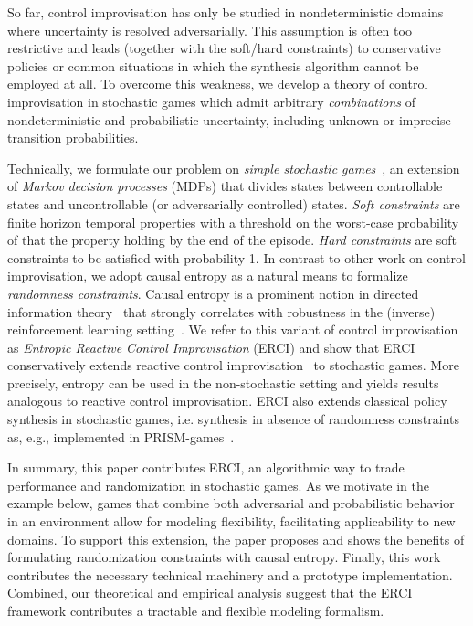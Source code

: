 So far, control improvisation has  only be studied in 
nondeterministic domains where uncertainty is resolved
adversarially. This assumption is often too restrictive and leads
(together with the soft/hard constraints) to conservative policies or
common situations in which the synthesis algorithm cannot be employed
at all. To overcome this weakness, we develop a theory of control
improvisation in stochastic games which admit
arbitrary \emph{combinations} of nondeterministic and probabilistic
uncertainty, including unknown or imprecise transition
probabilities. 

Technically, we formulate our problem on \emph{simple stochastic
games}~\cite{DBLP:conf/dimacs/Condon90}, an extension of \emph{Markov decision processes} (MDPs) that divides states
between controllable states and uncontrollable (or adversarially
controlled) states. \emph{Soft constraints} are finite horizon
temporal properties with a threshold on the worst-case probability of
that the property holding by the end of the episode. \emph{Hard
constraints} are soft constraints to be satisfied with probability 1. In
contrast to other work on control improvisation, we adopt causal entropy as a natural means to formalize \emph{randomness
constraints}.  Causal entropy is a prominent notion in directed
information theory~\cite{DirectedInfoTheoery} that strongly correlates with robustness in the
(inverse) reinforcement learning setting~\cite{mceThesis,
maxEntAnswer}. We refer to this variant of control improvisation as
\emph{Entropic Reactive Control Improvisation} (ERCI) and show that ERCI
conservatively extends reactive control improvisation~\cite{DBLP:conf/cav/FremontS18} to stochastic
games. More precisely, entropy can
be used in the non-stochastic setting and yields results analogous to
reactive control improvisation. ERCI also extends  classical policy synthesis in stochastic games, i.e. synthesis in absence of randomness constraints as, e.g., implemented in PRISM-games~\cite{DBLP:journals/sttt/KwiatkowskaPW18}.


%
In summary, this paper contributes ERCI, an algorithmic way to trade
performance and randomization in stochastic games. As we motivate in
the example below, games that combine both adversarial and
probabilistic behavior in an environment allow for modeling
flexibility, facilitating applicability to new domains. To support this
extension, the paper proposes and shows the benefits of formulating
randomization constraints with causal entropy.  Finally, this work
contributes the necessary technical machinery and a prototype 
implementation. Combined, our theoretical and empirical analysis
suggest that the ERCI framework contributes a tractable and flexible
modeling formalism.

